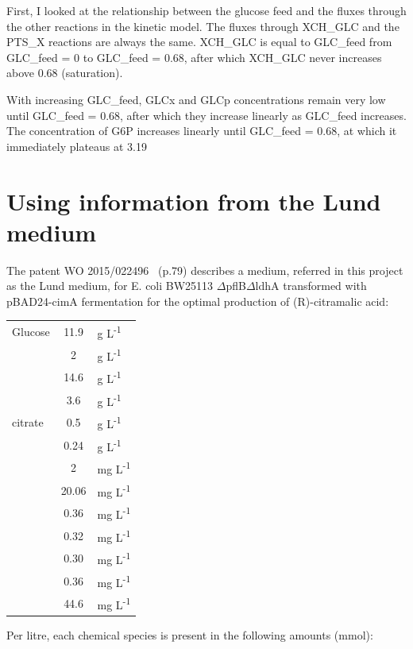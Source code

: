\documentclass[parskip=full]{scrreprt}
\begin{document}
First, I looked at the relationship between the glucose feed and the fluxes through the other reactions in the kinetic model. The fluxes through XCH\_GLC and the PTS\_X reactions are always the same. XCH\_GLC is equal to GLC\_feed from GLC\_feed = 0 to GLC\_feed = 0.68, after which XCH\_GLC never increases above 0.68 (saturation).

With increasing GLC\_feed, GLCx and GLCp concentrations remain very low until GLC\_feed = 0.68, after which they increase linearly as GLC\_feed increases. The concentration of G6P increases linearly until GLC\_feed = 0.68, at which it immediately plateaus at 3.19

\section{Using information from the Lund medium}
\label{sec:lund}

The patent WO 2015/022496~\cite{eastham_process_2015} (p.79) describes a medium, referred in this project as the Lund medium, for E. coli BW25113 $\Delta$pflB$\Delta$ldhA transformed with pBAD24-cimA fermentation for the optimal production of (R)-citramalic acid:

\begin{tabular}{lSl}
  Glucose & 11.9 & g L\textsuperscript{-1}\\
   & 2 & g L\textsuperscript{-1}\\
   & 14.6 & g L\textsuperscript{-1}\\
   & 3.6 & g L\textsuperscript{-1}\\
   citrate & 0.5 & g L\textsuperscript{-1}\\
   & 0.24 & g L\textsuperscript{-1}\\
   & 2 & mg L\textsuperscript{-1}\\
   & 20.06 & mg L\textsuperscript{-1}\\
   & 0.36 & mg L\textsuperscript{-1}\\
   & 0.32 & mg L\textsuperscript{-1}\\
   & 0.30 & mg L\textsuperscript{-1}\\
   & 0.36 & mg L\textsuperscript{-1}\\
   & 44.6 & mg L\textsuperscript{-1}
\end{tabular}

Per litre, each chemical species is present in the following amounts (mmol):
\end{document}
